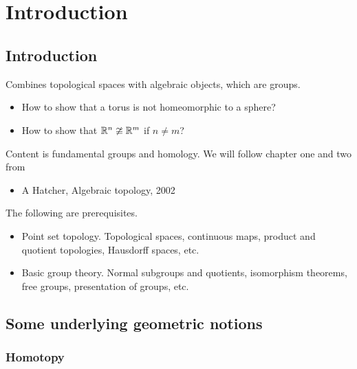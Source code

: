\def\module{M3P21 Geometry II: Algebraic Topology}
\def\lecturer{Dr Christian Urech}
\def\term{Spring 2019}

\def\thm{section}







\section{Introduction}


\subsection{Introduction}

Combines topological spaces with algebraic objects, which are groups.
\begin{itemize}
\item How to show that a torus is not homeomorphic to a sphere?
\item How to show that $ \mathbb{R}^n \ncong \mathbb{R}^m $ if $ n \ne m $?
\end{itemize}

Content is fundamental groups and homology. We will follow chapter one and two from
\begin{itemize}
\item A Hatcher, Algebraic topology, 2002
\end{itemize}

The following are prerequisites.
\begin{itemize}
\item Point set topology. Topological spaces, continuous maps, product and quotient topologies, Hausdorff spaces, etc.
\item Basic group theory. Normal subgroups and quotients, isomorphism theorems, free groups, presentation of groups, etc.
\end{itemize}

\subsection{Some underlying geometric notions}

\subsubsection{Homotopy}

